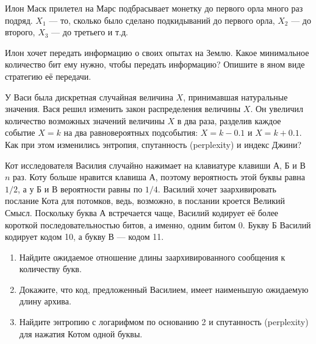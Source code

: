 \documentclass[12pt, a4paper, oneside]{article}
\begin{document}
\begin{problem}{}
Илон Маск прилетел на Марс подбрасывает монетку до первого орла много раз подряд. $X_1$ --- то, сколько было сделано подкидываний до первого орла, $X_2$ --- до второго, $X_3$ --- до третьего и т.д. 

Илон хочет передать информацию о своих опытах на Землю. Какое минимальное количество бит ему нужно, чтобы передать информацию? Опишите в яном виде стратегию её передачи. 
\end{problem}


\begin{problem}{}
У Васи была дискретная случайная величина $X$, принимавшая натуральные значения. Вася решил изменить закон распределения величины $X$. Он увеличил количество возможных значений величины $X$ в два раза, разделив каждое событие $X=k$ на два равновероятных подсобытия: $X=k-0.1$ и $X=k+0.1$. Как при этом изменились энтропия, спутанность (perplexity) и индекс Джини?
\end{problem}


\begin{problem}{}
Кот исследователя Василия случайно нажимает на клавиатуре клавиши А, Б и В $n$ раз. Коту больше нравится клавиша А, поэтому вероятность этой буквы равна $1/2$, а у Б и В вероятности равны по $1/4$. Василий хочет заархивировать послание Кота для потомков, ведь, возможно, в послании кроется Великий Смысл. Поскольку буква А встречается чаще, Василий кодирует её более короткой последовательностью битов, а именно, одним битом 0. Букву Б Василий кодирует кодом 10, а букву В — кодом 11.

\begin{enumerate}
\item Найдите ожидаемое отношение длины заархивированного сообщения к количеству букв.
\item Докажите, что код, предложенный Василием, имеет наименьшую ожидаемую длину архива.
\item Найдите энтропию с логарифмом по основанию 2 и спутанность (perplexity) для нажатия Котом одной буквы.
\end{enumerate}
\end{problem}

\end{document}
